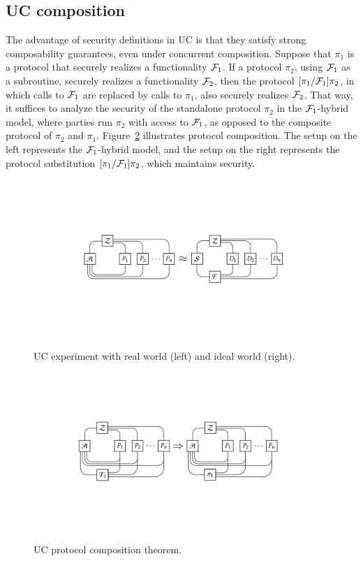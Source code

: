 \subsection{UC composition}
\label{subsec:composition}

The advantage of security definitions in UC is that they satisfy strong
composability guarantees, even under concurrent composition. Suppose that $\pi_1$
is a protocol that securely realizes a functionality $\mathcal{{F}}_1$. If a protocol
$\pi_2$, using $\mathcal{{F}}_1$ as a subroutine, securely realizes a functionality
$\mathcal{{F}}_2$, then the protocol $[\pi_1 / \mathcal{{F}}_1]\pi_2$, in which calls to
$\mathcal{{F}}_1$ are replaced by calls to $\pi_1$, also securely realizes
$\mathcal{{F}}_2$. That way, it suffices to analyze the security of the standalone
protocol $\pi_2$ in the $\mathcal{{F}}_1$-hybrid model, where parties run $\pi_2$ with
access to $\mathcal{{F}}_1$, as opposed to the composite protocol of $\pi_2$ and
$\pi_1$. Figure~\ref{fig:uc-composition} illustrates protocol composition. The
setup on the left represents the $\mathcal{{F}}_1$-hybrid model, and the setup on the
right represents the protocol substitution $[\pi_1 / \mathcal{{F}}_1]\pi_2$, which
maintains security.

\begin{figure}
  \centering
  \includegraphics[width=\linewidth]{graphics/uc-experiment}
  \caption{UC experiment with real world (left) and ideal world (right).}
  \label{fig:uc-experiment}
\end{figure}

\begin{figure}
  \centering
  \includegraphics[width=\linewidth]{graphics/composition}
  \caption{UC protocol composition theorem.}
  \label{fig:uc-composition}
\end{figure}
